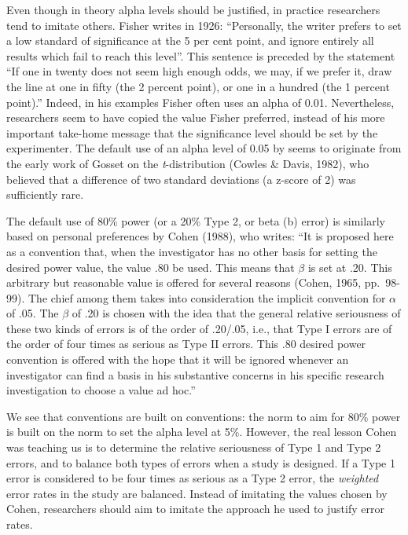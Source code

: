 \documentclass[,jou,floatsintext]{apa6}
\begin{document}
Even though in theory alpha levels should be justified, in practice researchers tend to imitate others. Fisher writes in 1926: \enquote{Personally, the writer prefers to set a low standard of significance at the 5 per cent point, and ignore entirely all results which fail to reach this level}. This sentence is preceded by the statement \enquote{If one in twenty does not seem high enough odds, we may, if we prefer it, draw the line at one in fifty (the 2 percent point), or one in a hundred (the 1 percent point).} Indeed, in his examples Fisher often uses an alpha of 0.01. Nevertheless, researchers seem to have copied the value Fisher preferred, instead of his more important take-home message that the significance level should be set by the experimenter. The default use of an alpha level of 0.05 by seems to originate from the early work of Gosset on the \emph{t}-distribution (Cowles \& Davis, 1982), who believed that a difference of two standard deviations (a z-score of 2) was sufficiently rare.

The default use of 80\% power (or a 20\% Type 2, or beta (b) error) is similarly based on personal preferences by Cohen (1988), who writes: \enquote{It is proposed here as a convention that, when the investigator has no other basis for setting the desired power value, the value .80 be used. This means that \(\beta\) is set at .20. This arbitrary but reasonable value is offered for several reasons (Cohen, 1965, pp.~98-99). The chief among them takes into consideration the implicit convention for \(\alpha\) of .05. The \(\beta\) of .20 is chosen with the idea that the general relative seriousness of these two kinds of errors is of the order of .20/.05, i.e., that Type I errors are of the order of four times as serious as Type II errors. This .80 desired power convention is offered with the hope that it will be ignored whenever an investigator can find a basis in his substantive concerns in his specific research investigation to choose a value ad hoc.}

We see that conventions are built on conventions: the norm to aim for 80\% power is built on the norm to set the alpha level at 5\%. However, the real lesson Cohen was teaching us is to determine the relative seriousness of Type 1 and Type 2 errors, and to balance both types of errors when a study is designed. If a Type 1 error is considered to be four times as serious as a Type 2 error, the \emph{weighted} error rates in the study are balanced. Instead of imitating the values chosen by Cohen, researchers should aim to imitate the approach he used to justify error rates.
\end{document}
